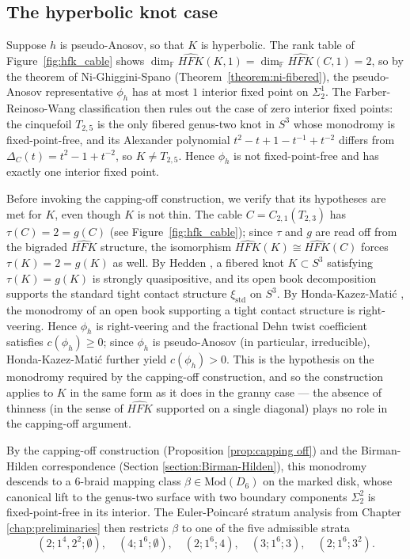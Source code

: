 \subsection{The hyperbolic knot case}\label{subsec:cable_hyperbolic}

Suppose $h$ is pseudo-Anosov, so that $K$ is hyperbolic. The rank table of Figure~\ref{fig:hfk_cable} shows $\dim_{\mathbb{F}} \widehat{HFK}(K, 1) = \dim_{\mathbb{F}} \widehat{HFK}(C, 1) = 2$, so by the theorem of Ni-Ghiggini-Spano (Theorem~\ref{theorem:ni-fibered}), the pseudo-Anosov representative $\phi_h$ has at most $1$ interior fixed point on $\Sigma_2^1$. The Farber-Reinoso-Wang classification \cite{farber2024fixed} then rules out the case of zero interior fixed points: the cinquefoil $T_{2,5}$ is the only fibered genus-two knot in $S^3$ whose monodromy is fixed-point-free, and its Alexander polynomial $t^2 - t + 1 - t^{-1} + t^{-2}$ differs from $\Delta_C(t) = t^2 - 1 + t^{-2}$, so $K \neq T_{2,5}$. Hence $\phi_h$ is not fixed-point-free and has exactly one interior fixed point.

Before invoking the capping-off construction, we verify that its hypotheses are met for $K$, even though $K$ is not thin. The cable $C = C_{2,1}(T_{2,3})$ has $\tau(C) = 2 = g(C)$ (see Figure~\ref{fig:hfk_cable}); since $\tau$ and $g$ are read off from the bigraded $\widehat{HFK}$ structure, the isomorphism $\widehat{HFK}(K) \cong \widehat{HFK}(C)$ forces $\tau(K) = 2 = g(K)$ as well. By Hedden \cite{Hedden2010}, a fibered knot $K \subset S^3$ satisfying $\tau(K) = g(K)$ is strongly quasipositive, and its open book decomposition supports the standard tight contact structure $\xi_{\mathrm{std}}$ on $S^3$. By Honda-Kazez-Mati\'c \cite{honda2007right}, the monodromy of an open book supporting a tight contact structure is right-veering. Hence $\phi_h$ is right-veering and the fractional Dehn twist coefficient satisfies $c(\phi_h) \geq 0$; since $\phi_h$ is pseudo-Anosov (in particular, irreducible), Honda-Kazez-Mati\'c further yield $c(\phi_h) > 0$. This is the hypothesis on the monodromy required by the capping-off construction, and so the construction applies to $K$ in the same form as it does in the granny case --- the absence of thinness (in the sense of $\widehat{HFK}$ supported on a single diagonal) plays no role in the capping-off argument.

By the capping-off construction (Proposition \ref{prop:capping off}) and the Birman-Hilden correspondence (Section \ref{section:Birman-Hilden}), this monodromy descends to a 6-braid mapping class $\beta \in \mathrm{Mod}(D_6)$ on the marked disk, whose canonical lift to the genus-two surface with two boundary components $\Sigma_2^2$ is fixed-point-free in its interior. The Euler-Poincar\'{e} stratum analysis from Chapter \ref{chap:preliminaries} then restricts $\beta$ to one of the five admissible strata
\[
(2; 1^4, 2^2; \emptyset),\quad (4; 1^6; \emptyset),\quad (2; 1^6; 4),\quad (3; 1^6; 3),\quad (2; 1^6; 3^2).
\]

